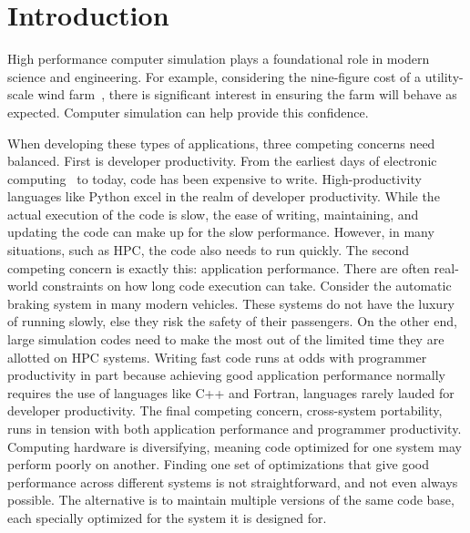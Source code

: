 \chapter{Introduction}

High performance computer simulation plays a foundational role in modern science and engineering.
For example, considering the nine-figure cost of a utility-scale wind farm~\cite{wiser2022land}, there is significant interest in ensuring the farm will behave as expected. 
Computer simulation can help provide this confidence.

When developing these types of applications, three competing concerns need balanced. 
First is developer productivity.
From the earliest days of electronic computing~\cite{backus1957fortran} to today, code has been expensive to write.
High-productivity languages like Python excel in the realm of developer productivity.
While the actual execution of the code is slow, the ease of writing, maintaining, and updating the code can make up for the slow performance.
However, in many situations, such as HPC, the code also needs to run quickly.
The second competing concern is exactly this: application performance.
There are often real-world constraints on how long code execution can take.
Consider the automatic braking system in many modern vehicles.
These systems do not have the luxury of running slowly, else they risk the safety of their passengers.
On the other end, large simulation codes need to make the most out of the limited time they are allotted on HPC systems.
Writing fast code runs at odds with programmer productivity in part because achieving good application performance normally requires the use of languages like C++ and Fortran, languages rarely lauded for developer productivity.
The final competing concern, cross-system portability, runs in tension with both application performance and programmer productivity.
Computing hardware is diversifying, meaning code optimized for one system may perform poorly on another.
Finding one set of optimizations that give good performance across different systems is not straightforward, and not even always possible.
The alternative is to maintain multiple versions of the same code base, each specially optimized for the system it is designed for.

